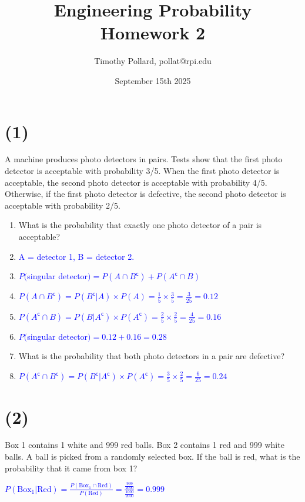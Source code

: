 \documentclass[12pt]{article}
\title{Engineering Probability \\ Homework 2}
\author{Timothy Pollard, pollat@rpi.edu}
\date{September 15th 2025}
\begin{document}
\maketitle
\hrulefill

\section*{(1)}
A machine produces photo detectors in pairs. Tests show that the first photo
detector is acceptable with probability 3/5. When the first photo detector is acceptable,
the second photo detector is acceptable with probability 4/5. Otherwise, if the first photo
detector is defective, the second photo detector is acceptable with probability 2/5.

\begin{enumerate}
\item[(a)] What is the probability that exactly one photo detector of a pair is acceptable?
\item[] \textcolor{blue}{A = detector 1, B = detector 2.}
\item[] \textcolor{blue}{$P($singular detector$) = P(A \cap B^\mathsf{c}) + P(A^\mathsf{c} \cap B)$}
\item[] \textcolor{blue}{$P(A \cap B^\mathsf{c}) = P(B^\mathsf{c}|A)\times P(A) = \frac{1}{5} \times \frac{3}{5}= \frac{3}{25}= 0.12$}
\item[] \textcolor{blue}{$P(A^\mathsf{c} \cap B) = P(B|A^\mathsf{c})\times P(A^\mathsf{c}) = \frac{2}{5}\times \frac{2}{5} = \frac{4}{25}= 0.16$}
\item[] \textcolor{blue}{$P($singular detector$) = 0.12+0.16=0.28$}
\item[(b)] What is the probability that both photo detectors in a pair are defective?
\item[] \textcolor{blue}{$P(A^\mathsf{c} \cap B^\mathsf{c}) = P(B^\mathsf{c}|A^\mathsf{c})\times P(A^\mathsf{c}) = \frac{3}{5} \times \frac{2}{5} = \frac{6}{25} = 0.24$}
\end{enumerate}

\section*{(2)}
 Box 1 contains 1 white and 999 red balls. Box 2 contains 1 red and 999 white
balls. A ball is picked from a randomly selected box. If the ball is red, what is the
probability that it came from box 1? 

\textcolor{blue}{\(P(\text{Box}_1| \text{Red})= \frac{P(\text{Box}_1 \cap \text{Red})}{P(\text{Red})} = \frac{\frac{999}{2000}}{\frac{1000}{2000}} = 0.999\)}
\end{document}
